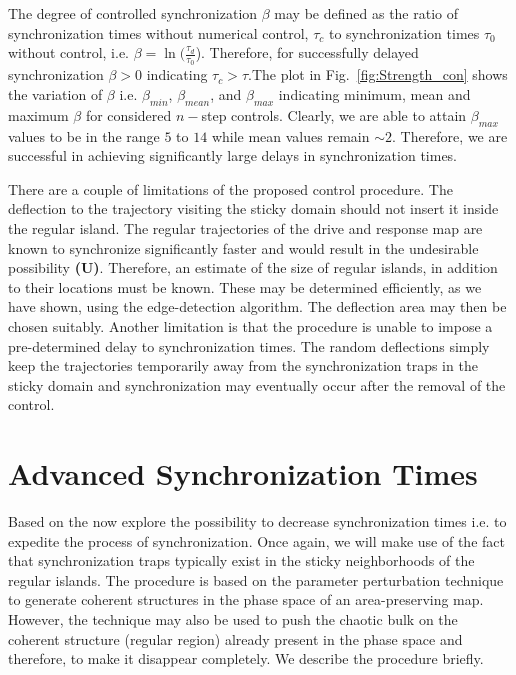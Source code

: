 \documentclass[reprint,superscriptaddress,amsmath,amssymb,aps,pre]{revtex4-1}
\begin{document}
The degree of controlled synchronization $\beta$ may be defined as the ratio 
of synchronization times without numerical control, $\tau_c$ to 
synchronization times $\tau_0$ without control, i.e. $\beta =  
\ln(\frac{\tau_d}{\tau_0}$).  Therefore, for successfully delayed 
synchronization $\beta>0$ indicating $\tau_c > \tau$.The plot in 
Fig.~\ref{fig:Strength_con} shows the variation of $\beta$ i.e. $\beta_{min}$, 
$\beta_{mean}$, and $\beta_{max}$  indicating minimum, mean and maximum 
$\beta$ for considered $n-$step controls. Clearly, we are able to attain 
$\beta_{max}$ values to be in the range $5$ to $14$ while mean values remain 
$\sim2$. Therefore, we are successful in achieving 
significantly large delays in synchronization times. 


There are a couple of limitations of the proposed control procedure. The deflection to the trajectory visiting the sticky domain should not insert it inside the regular island. The regular trajectories of the drive and response map are known to synchronize significantly faster and would result in the undesirable possibility \textbf{(U)}. Therefore, an estimate of the size of regular islands, in addition to their locations must be known. These may be determined efficiently, as we have shown, using the edge-detection algorithm. The deflection area  may then be chosen suitably.  Another limitation is that the procedure is unable to impose a pre-determined delay to synchronization times. The random deflections simply keep the trajectories temporarily away from the synchronization traps in the sticky domain and synchronization may eventually occur after the removal of the control. 


\section{Advanced Synchronization Times}
\label{sec:advanced}
Based on the now explore the possibility to decrease synchronization times 
i.e. to expedite the process of synchronization. Once again, we will make use 
of the fact that synchronization traps typically exist in the sticky 
neighborhoods of the regular islands.  The procedure is based on the parameter 
perturbation technique to generate coherent structures in the phase space of 
an area-preserving map. However, the technique may also be used to push the 
chaotic bulk on the coherent structure (regular region) already present in the 
phase space and therefore, to make it disappear completely.  We describe the 
procedure briefly. 
\end{document}
